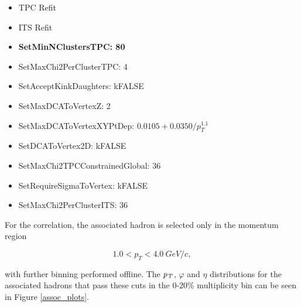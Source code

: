 \documentclass[ALICE,manyauthors]{ALICE_analysis_notes}
\begin{document}
\begin{itemize}
    \item TPC Refit
    \item ITS Refit
	\item \textbf{SetMinNClustersTPC: 80}
	\item SetMaxChi2PerClusterTPC: 4
	\item SetAcceptKinkDaughters: kFALSE
	\item SetMaxDCAToVertexZ: 2
	\item SetMaxDCAToVertexXYPtDep: $0.0105+0.0350/p_{T}^{1.1}$
	\item SetDCAToVertex2D: kFALSE
	\item SetMaxChi2TPCConstrainedGlobal: 36
	\item SetRequireSigmaToVertex: kFALSE
	\item SetMaxChi2PerClusterITS: 36
\end{itemize}

For the correlation, the associated hadron is selected only in the momentum region

$${1.0 < p_{T} < \SI{4.0}{GeV/c}},$$ 

with further binning performed offline. The $\it{p}_{T}$, $\varphi$ and $\eta$ distributions for the associated hadrons that pass these cuts in the 0-20\% multiplicity bin can be seen in Figure \ref{assoc_plots}.
\end{document}
